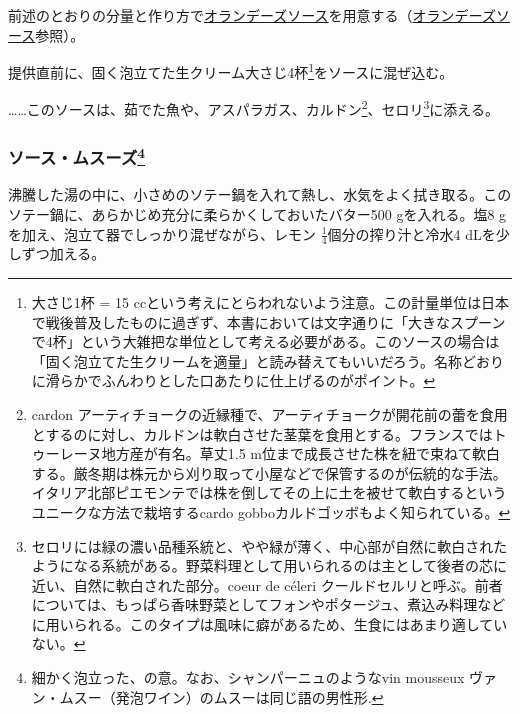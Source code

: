 \begin{recette}
前述のとおりの分量と作り方で\protect\hyperlink{sauce-hollandaise}{オランデーズソース}を用意する（\protect\hyperlink{sauce-hollandaise}{オランデーズソース}参照）。

提供直前に、固く泡立てた生クリーム大さじ4杯\footnote{大さじ1杯 = 15
  ccという考えにとらわれないよう注意。この計量単位は日本で戦後普及したものに過ぎず、本書においては文字通りに「大きなスプーンで4杯」という大雑把な単位として考える必要がある。このソースの場合は「固く泡立てた生クリームを適量」と読み替えてもいいだろう。名称どおりに滑らかでふんわりとした口あたりに仕上げるのがポイント。}をソースに混ぜ込む。

\ldots{}\ldots{}このソースは、茹でた魚や、アスパラガス、カルドン\footnote{cardon
  アーティチョークの近縁種で、アーティチョークが開花前の蕾を食用とするのに対し、カルドンは軟白させた茎葉を食用とする。フランスではトゥーレーヌ地方産が有名。草丈1.5
  m位まで成長させた株を紐で束ねて軟白する。厳冬期は株元から刈り取って小屋などで保管するのが伝統的な手法。イタリア北部ピエモンテでは株を倒してその上に土を被せて軟白するというユニークな方法で栽培するcardo
  gobboカルドゴッボもよく知られている。}、セロリ\footnote{セロリには緑の濃い品種系統と、やや緑が薄く、中心部が自然に軟白されたようになる系統がある。野菜料理として用いられるのは主として後者の芯に近い、自然に軟白された部分。coeur
  de céleri
  クールドセルリと呼ぶ。前者については、もっぱら香味野菜としてフォンやポタージュ、煮込み料理などに用いられる。このタイプは風味に癖があるため、生食にはあまり適していない。}に添える。

\hypertarget{sauce-mousseuse}{%
\subsubsection[ソース・ムスーズ]{\texorpdfstring{ソース・ムスーズ\footnote{細かく泡立った、の意。なお、シャンパーニュのようなvin
  mousseux ヴァン・ムスー（発泡ワイン）のムスーは同じ語の男性形.}}{ソース・ムスーズ}}\label{sauce-mousseuse}}



沸騰した湯の中に、小さめのソテー鍋を入れて熱し、水気をよく拭き取る。このソテー鍋に、あらかじめ充分に柔らかくしておいたバター500
gを入れる。塩8 gを加え、泡立て器でしっかり混ぜながら、レモン
\(\frac{1}{4}\)個分の搾り汁と冷水4 dLを少しずつ加える。


\end{recette}
